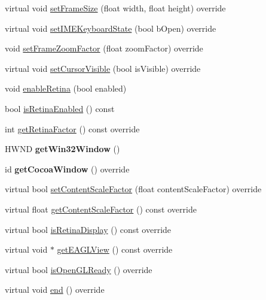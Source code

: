 \begin{DoxyCompactItemize}
\item 
virtual void \hyperlink{classGLViewImpl_a73c722d907a4428983a5059aac85af46}{set\+Frame\+Size} (float width, float height) override
\item 
virtual void \hyperlink{classGLViewImpl_a37e04acaf52f6258ebe98d6b36c3b6c3}{set\+I\+M\+E\+Keyboard\+State} (bool b\+Open) override
\item 
void \hyperlink{classGLViewImpl_aa8868ddca63e739ecfc2beeeaa61c1dd}{set\+Frame\+Zoom\+Factor} (float zoom\+Factor) override
\item 
virtual void \hyperlink{classGLViewImpl_a6a90e8743caf5fff31f0502dc44c986d}{set\+Cursor\+Visible} (bool is\+Visible) override
\item 
void \hyperlink{classGLViewImpl_acbad07a997193bc23d8bec639f333040}{enable\+Retina} (bool enabled)
\item 
bool \hyperlink{classGLViewImpl_ab05ff2acc127d3eaeacefd9a5b116550}{is\+Retina\+Enabled} () const
\item 
int \hyperlink{classGLViewImpl_a0844b876076edafc4f6e47e3fafb16da}{get\+Retina\+Factor} () const override
\item 
\mbox{\label{classGLViewImpl_a0e04667b5e20aa6e96627418ee4110bd}} 
H\+W\+ND {\bfseries get\+Win32\+Window} ()
\item 
\mbox{\label{classGLViewImpl_a25fd0aa14c1928428f28dcf6831e850a}} 
id {\bfseries get\+Cocoa\+Window} () override
\item 
virtual bool \hyperlink{classGLViewImpl_a7bd1df076bd10554cc6aff25f2b07238}{set\+Content\+Scale\+Factor} (float content\+Scale\+Factor) override
\item 
virtual float \hyperlink{classGLViewImpl_a507c696f2d69451ca36ff787a996bf22}{get\+Content\+Scale\+Factor} () const override
\item 
virtual bool \hyperlink{classGLViewImpl_a3c02a8e95e8f2ee4821935f78be3f6b0}{is\+Retina\+Display} () const override
\item 
virtual void $\ast$ \hyperlink{classGLViewImpl_aaddd8dc59db9a517edb63238f79e1c55}{get\+E\+A\+G\+L\+View} () const override
\item 
virtual bool \hyperlink{classGLViewImpl_af539e58d1d28db65ba47f107c9c801d7}{is\+Open\+G\+L\+Ready} () override
\item 
virtual void \hyperlink{classGLViewImpl_ab5a08a3ea92598cdabbed94686eed58a}{end} () override
\item 

\end{DoxyCompactItemize}
